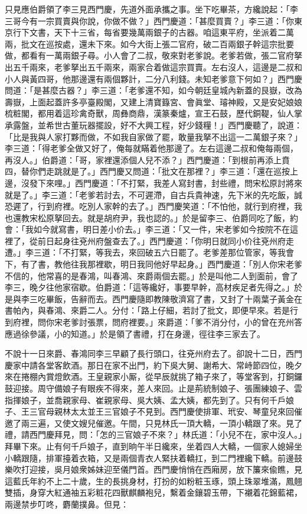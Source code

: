 只見應伯爵領了李三見西門慶，先道外面承攜之事。坐下吃畢茶，方纔說起：「李三哥今有一宗買賣與你說，你做不做？」西門慶道：「甚麼買賣？」李三道：「你東京行下文書，天下十三省，每省要幾萬兩銀子的古器。咱這東平府，坐派着二萬兩，批文在巡按處，還未下來。如今大街上張二官府，破二百兩銀子幹這宗批要做，都看有一萬兩銀子尋。小人會了二叔，敬來對老爹說。老爹若做，張二官府拏出五千兩來，老爹拏出五千兩來，兩家合着做這宗買賣。左右沒人，這邊是二叔和小人與黃四哥，他那邊還有兩個夥計，二分八利錢。未知老爹意下何如？」西門慶問道：「是甚麼古器？」李三道：「老爹還不知，如今朝廷皇城內新蓋的艮嶽，改為壽嶽，上面起蓋許多亭臺殿閣，又建上清寶籙宮、會眞堂、璿神殿，又是安妃娘娘梳粧閣，都用着這珍禽奇獸，周彝商鼎，漢篆秦爐，宣王石鼓，歷代銅鞮，仙人掌承露盤，並希世古董玩器擺設，好不大興工程，好少錢糧！」{}西門慶聽了，說道：「比是我與人家打夥而做，不如我自家做了罷，敢量我拏不出這一二萬銀子來？」{}李三道：「得老爹全做又好了，俺每就瞞着他那邊了。左右這邊二叔和俺每兩個，再沒人。」伯爵道：「哥，家裡還添個人兒不添？」西門慶道：「到根前再添上賁四，替你們走跳就是了。」西門慶又問道：「批文在那裡？」李三道：「還在巡按上邊，沒發下來哩。」西門慶道：「不打緊，我差人寫封書，封些禮，問宋松原討將來就是了。」李三道：「老爹若討去，不可遲滯，自古兵貴神速，先下米的先吃飯，誠恐遲了，行到府裡。吃別人家幹的去了。」西門慶笑道：「不怕他，就行到府裡，我也還教宋松原拏回去。就是胡府尹，我也認的。」於是留李三、伯爵同吃了飯，約會：「我如今就寫書，明日差小价去。」李三道：「又一件，宋老爹如今按院不在這裡了，從前日起身往兗州府盤查去了。」西門慶道：「你明日就同小价往兗州府走遭。」李三道：「不打緊，等我去，來回破五六日罷了。老爹差那位管家，等我會下，有了書，教他往我那裡歇，明日我同他好早起身。」西門慶道：「別人你宋老爹不信的，他常喜的是春鴻，叫春鴻、來爵兩個去罷。」於是叫他二人到面前，會了李三，晚夕往他家宿歇。伯爵道：「這等纔好，事要早幹，高材疾足者先得之。」於是與李三吃畢飯，告辭而去。西門慶隨即教陳敬濟寫了書，又封了十兩葉子黃金在書帕內，與春鴻、來爵二人。分付：「路上仔細，若討了批文，即便早來。若是行到府裡，問你宋老爹討張票，問府裡要。」來爵道：「爹不消分付，小的曾在充州答應過徐參議，小的知道。」於是領了書禮，打在身邊，徑往李三家去了。

不說十一日來爵、春鴻同李三早顧了長行頭口，往兗州府去了。卻說十二日，西門慶家中請各堂客飲酒。那日在家不出門，約下吳大舅、謝希大、常峙節四位，晚夕來在捲棚內賞燈飲酒。王皇親家小厮，從早辰就挑了箱子來了，等堂客到，打銅鑼鼓迎接。周守備娘子有眼疾不得來，差人來回。止是荊統制娘子、張團練娘子、雲指揮娘子，並喬親家母、崔親家母、吳大姨、孟大姨，都先到了。只有何千戶娘子、王三官母親林太太並王三官娘子不見到。{}西門慶使排軍、玳安、琴童兒來回催邀了兩三遍，又使文嫂兒催邀。午間，只見林氏一頂大轎，一頂小轎跟了來。見了禮，請西門慶拜見，問：「怎的三官娘子不來？」林氏道：「小兒不在，家中沒人。」拜畢下來。止有何千戶娘子，直到晌午半日纔來，坐着四人大轎，一個家人媳婦坐小轎跟隨，排軍擡着衣箱，又是兩個青衣人緊扶着轎扛，到二門裡纔下轎。前邊鼓樂吹打迎接，吳月娘衆姊妹迎至儀門首。西門慶悄悄在西廂房，放下簾來偸瞧，見這藍氏年約不上二十歲，生的長挑身材，打扮的如粉粧玉琢，頭上珠翠堆滿，鳳翹雙插，身穿大紅通袖五彩粧花四獸麒麟袍兒，繫着金鑲碧玉帶，下襯着花錦藍裙，兩邊禁步叮咚，麝蘭撲鼻。但見：

